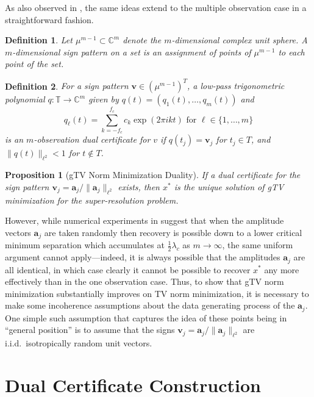 \documentclass[11pt]{article}
\newcommand{\TT}{\mathbb{T}}
\newcommand{\CC}{\mathbb{C}}
\newcommand{\ba}{\bm a}
\newcommand{\bv}{\bm v}
\newtheorem{definition}{Definition}
\newtheorem{proposition}{Proposition}
\newcounter{para}
\begin{document}
As also observed in \cite{fernandez2016super}, the same ideas extend to the multiple observation case in a straightforward fashion.
\begin{definition}
    Let $\mu^{m - 1} \subset \CC^m$ denote the $m$-dimensional complex unit sphere.
    A \emph{$m$-dimensional sign pattern} on a set is an assignment of points of $\mu^{m - 1}$ to each point of the set.
\end{definition}
\begin{definition}
    For a sign pattern $\bv \in (\mu^{m - 1})^T$, a low-pass trigonometric polynomial $q: \TT \to \CC^m$ given by $q(t) = (q_1(t), \dots, q_m(t))$ and
    \begin{equation}
        q_\ell(t) = \sum_{k = -f_c}^{f_c} c_k \exp(2\pi i k t) \text{ for } \ell \in \{1, \dots, m\}
    \end{equation}
    is an \emph{$m$-observation dual certificate} for $v$ if $q(t_j) = \bv_j$ for $t_j \in T$, and $\|q(t)\|_{\ell^2} < 1$ for $t \notin T$.
\end{definition}
\begin{proposition}[\textsf{gTV} Norm Minimization Duality]
    If a dual certificate for the sign pattern $\bv_j = \ba_{j} / \|\ba_{j}\|_{\ell^2}$ exists, then $x^*$ is the unique solution of \textsf{gTV} minimization for the super-resolution problem.
\end{proposition}
However, while numerical experiments in \cite{fernandez2016super} suggest that when the amplitude vectors $\ba_j$ are taken randomly then recovery is possible down to a lower critical minimum separation which accumulates at $\frac{1}{2}\lambda_c$ as $m \to \infty$, the same uniform argument cannot apply---indeed, it is always possible that the amplitudes $\ba_j$ are all identical, in which case clearly it cannot be possible to recover $x^*$ any more effectively than in the one observation case.
Thus, to show that \textsf{gTV} norm minimization substantially improves on \textsf{TV} norm minimization, it is necessary to make some incoherence assumptions about the data generating process of the $\ba_j$.
One simple such assumption that captures the idea of these points being in ``general position'' is to assume that the signs $\bv_j = \ba_j / \|\ba_j\|_{\ell^2}$ are i.i.d.\ isotropically random unit vectors.

\section{Dual Certificate Construction}
\end{document}
